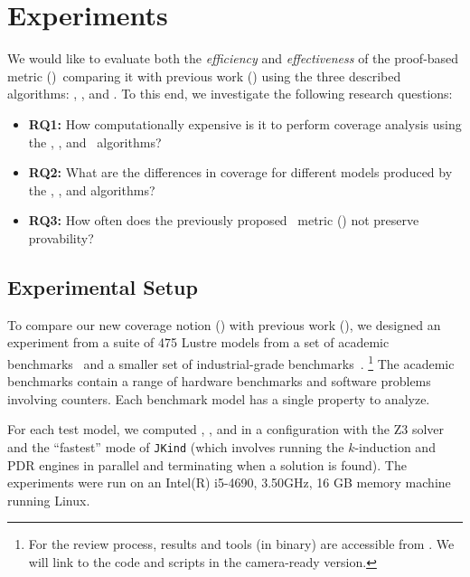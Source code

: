 \section{Experiments}
\label{sec:experiments}

We would like to evaluate both the {\em efficiency} and {\em
  effectiveness} of the proof-based metric (\ivccov)~comparing it with previous work (\nondetcov) using the three described algorithms: \ucalg, \ucbfalg, and \mustalg. To this end, we investigate the following research questions:
\begin{itemize}
    \item \textbf{RQ1:} How computationally expensive is it to perform coverage analysis using the \ucalg, \ucbfalg, and \mustalg\ algorithms?
    \item \textbf{RQ2:} What are the differences in coverage for different models produced by the \ucalg, \ucbfalg, and \mustalg algorithms?
    \item \textbf{RQ3:} How often does the previously proposed \nondetcov\ metric (\mustalg) not preserve provability?
\end{itemize}

\subsection{Experimental Setup}

To compare our new coverage notion (\ivccov) with previous work (\nondetcovalt), we designed an experiment from a suite of 475 Lustre models from a set of academic benchmarks~\cite{Hagen08:FMCAD} and a smaller set
of industrial-grade benchmarks~\cite{QFCS15:backes,hilt2013}.
\footnote{For the review process, results and tools (in binary) are accessible from \cite{anoexpr}. We will link to the code and scripts in the camera-ready version.}
The academic benchmarks contain a range of hardware benchmarks and
software problems involving counters. Each benchmark model has a single property to analyze.

For each test model, we computed \ucalg, \ucbfalg, and \mustalg in a configuration with
the Z3 solver and the ``fastest'' mode of \texttt{JKind} (which involves running the $k$-induction and PDR engines
in parallel and terminating when a solution is found). The experiments were run on an
Intel(R) i5-4690, 3.50GHz, 16 GB memory machine running Linux.




